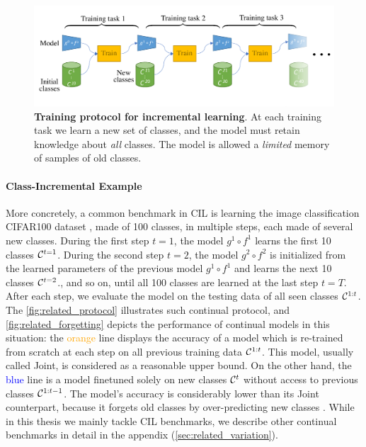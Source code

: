 \begin{figure}[tb]
      \begin{center}
            \includegraphics[width=1.0\linewidth]{images/related/protocol}
      \end{center}
      \caption{\textbf{Training protocol for incremental learning}. At each training task we learn a
            new set of classes, and the model must retain knowledge about \textit{all} classes. The
            model is allowed a \textit{limited} memory of samples of old classes.}
      \label{fig:related_protocol}
\end{figure}

\paragraph{Class-Incremental Example} More concretely, a common benchmark in \acf{CIL} is learning
the image classification CIFAR100 dataset \citep{krizhevskycifar100}, made of 100 classes, in
multiple steps, each made of several new classes. During the first step $t=1$, the model $g^1 \circ
      f^1$ learns the first 10 classes $\mathcal{C}^{t=1}$. During the second step $t=2$, the model $g^2 \circ
      f^2$ is initialized from the learned parameters of the previous model $g^1 \circ f^1$ and learns the
next 10 classes $\mathcal{C}^{t=2}$., and so on, until all 100 classes are learned at the last step $t=T$.
After each step, we evaluate the model on the testing data of all seen classes $\mathcal{C}^{1:t}$. The
\autoref{fig:related_protocol} illustrates such continual protocol, and
\autoref{fig:related_forgetting} depicts the performance of continual models in this situation: the
\textcolor{orange}{orange} line displays the accuracy of a model which is re-trained from scratch at
each step on all previous training data $\mathcal{C}^{1:t}$. This model, usually called Joint, is
considered as a reasonable upper bound. On the other hand, the \textcolor{blue}{blue} line is a
model finetuned solely on new classes $\mathcal{C}^{t}$ without access to previous classes $\mathcal{C}^{1:t-1}$.
The model's accuracy is considerably lower than its Joint counterpart, because it forgets old
classes by over-predicting new classes \citep{davidson2020masteryincremental}. While in this thesis
we mainly tackle \acf{CIL} benchmarks, we describe other continual benchmarks in detail in the
appendix (\autoref{sec:related_variation}).

